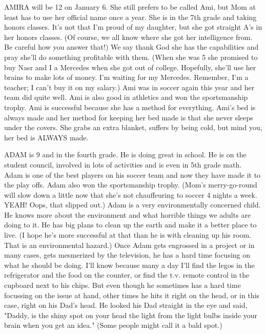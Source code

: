 AMIRA will be 12 on January 6. She still prefers to be called Ami, but Mom at least has to use her official name once a year. She is in the 7th
grade and taking honors classes. It's not that I'm proud of my daughter, but she got straight A's in her honors classes. (Of course, we all know
where she got her intelligence from. Be careful how you answer that!) We say thank God she has the capabilities and pray she'll do something
profitable with them. (When she was 5 she promised to buy Nasr and I a Mercedes when she got out of college. Hopefully, she'll use her brains to
make lots of money. I'm waiting for my Mercedes. Remember, I'm a teacher; I can't buy it on my salary.) Ami was in soccer again this year and
her team did quite well. Ami is also good in athletics and won the sportsmanship trophy. Ami is successful because she has a method for
everything. Ami's bed is always made and her method for keeping her bed made is that she never sleeps under the covers. She grabs an extra
blanket, suffers by being cold, but mind you, her bed is ALWAYS made.

ADAM is 9 and in the fourth grade. He is doing great in school. He is on the student council, involved in lots of activities and is even in 5th
grade math. Adam is one of the best players on his soccer team and now they have made it to the play offs. Adam also won the sportsmanship
trophy. (Mom's merry-go-round will slow down a little now that she's not chauffeuring to soccer 4 nights a week. YEAH! Oops, that slipped out.)
Adam is a very environmentally concerned child. He knows more about the environment and what horrible things we adults are doing to it. He has
big plans to clean up the earth and make it a better place to live. (I hope he's more successful at that than he is with cleaning up his room.
That is an environmental hazard.) Once Adam gets engrossed in a project or in many cases, gets mesmerized by the television, he has a hard time
focusing on what he should be doing. I'll know because many a day I'll find the legos in the refrigerator and the food on the counter, or find
the t.v. remote control in the cupboard next to his chips. But even though he sometimes has a hard time focussing on the issue at hand, other
times he hits it right on the head, or in this case, right on his Dad's head. He looked his Dad straight in the eye and said, "Daddy, is the
shiny spot on your head the light from the light bulbs inside your brain when you get an idea." (Some people might call it a bald spot.)

